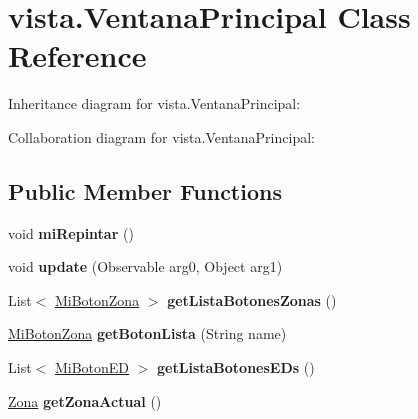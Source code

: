 \hypertarget{classvista_1_1_ventana_principal}{}\section{vista.\+Ventana\+Principal Class Reference}
\label{classvista_1_1_ventana_principal}


Inheritance diagram for vista.\+Ventana\+Principal\+:


Collaboration diagram for vista.\+Ventana\+Principal\+:
\subsection*{Public Member Functions}
\begin{DoxyCompactItemize}
\item 
\mbox{\label{classvista_1_1_ventana_principal_aac56c6c6f900b7a17c1797f343f68164}} 
void {\bfseries mi\+Repintar} ()
\item 
\mbox{\label{classvista_1_1_ventana_principal_a3d43755ba8664a494b1f79b97b82184a}} 
void {\bfseries update} (Observable arg0, Object arg1)
\item 
\mbox{\label{classvista_1_1_ventana_principal_a1b0d8e63220452c9089ff1f2ba863387}} 
List$<$ \mbox{\hyperlink{classvista_1_1_mi_boton_zona}{Mi\+Boton\+Zona}} $>$ {\bfseries get\+Lista\+Botones\+Zonas} ()
\item 
\mbox{\label{classvista_1_1_ventana_principal_a279cf62616a4bff041a1d0404bbcc89d}} 
\mbox{\hyperlink{classvista_1_1_mi_boton_zona}{Mi\+Boton\+Zona}} {\bfseries get\+Boton\+Lista} (String name)
\item 
\mbox{\label{classvista_1_1_ventana_principal_ad8b984ff16c9841f85d1d7b40b8a75e6}} 
List$<$ \mbox{\hyperlink{classvista_1_1_mi_boton_e_d}{Mi\+Boton\+ED}} $>$ {\bfseries get\+Lista\+Botones\+E\+Ds} ()
\item 
\mbox{\label{classvista_1_1_ventana_principal_a58cc9285cb9179a66284f52a2e7d0dd9}} 
\mbox{\hyperlink{classmodelo_1_1_zona}{Zona}} {\bfseries get\+Zona\+Actual} ()

\end{DoxyCompactItemize}
